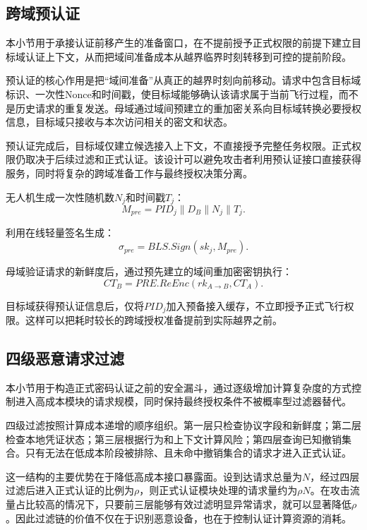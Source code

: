 \documentclass[conference]{IEEEtran}
\begin{document}
	\subsection{跨域预认证}
	
	本小节用于承接认证前移产生的准备窗口，在不提前授予正式权限的前提下建立目标域认证上下文，从而把域间准备成本从越界临界时刻转移到可控的提前阶段。
	
	预认证的核心作用是把“域间准备”从真正的越界时刻向前移动。请求中包含目标域标识、一次性Nonce和时间戳，使目标域能够确认该请求属于当前飞行过程，而不是历史请求的重复发送。母域通过域间预建立的重加密关系向目标域转换必要授权信息，目标域只接收与本次访问相关的密文和状态。
	
	预认证完成后，目标域仅建立候选接入上下文，不直接授予完整任务权限。正式权限仍取决于后续过滤和正式认证。该设计可以避免攻击者利用预认证接口直接获得服务，同时将复杂的跨域准备工作与最终授权决策分离。
	
	无人机生成一次性随机数$N_j$和时间戳$T_j$：
	\begin{equation}
		M_{pre}=PID_j\parallel D_B\parallel N_j\parallel T_j.
	\end{equation}
	
	利用在线轻量签名生成：
	\begin{equation}
		\sigma_{pre}=BLS.Sign(sk_j,M_{pre}).
	\end{equation}
	
	母域验证请求的新鲜度后，通过预先建立的域间重加密密钥执行：
	\begin{equation}
		CT_B=PRE.ReEnc(rk_{A\rightarrow B},CT_A).
	\end{equation}
	
	目标域获得预认证信息后，仅将$PID_j$加入预备接入缓存，不立即授予正式飞行权限。这样可以把耗时较长的跨域授权准备提前到实际越界之前。
	
	\subsection{四级恶意请求过滤}
	
	本小节用于构造正式密码认证之前的安全漏斗，通过逐级增加计算复杂度的方式控制进入高成本模块的请求规模，同时保持最终授权条件不被概率型过滤器替代。
	
	四级过滤按照计算成本递增的顺序组织。第一层只检查协议字段和新鲜度；第二层检查本地凭证状态；第三层根据行为和上下文计算风险；第四层查询已知撤销集合。只有无法在低成本阶段被排除、且未命中撤销集合的请求才进入正式认证。
	
	这一结构的主要优势在于降低高成本接口暴露面。设到达请求总量为$N$，经过四层过滤后进入正式认证的比例为$\rho$，则正式认证模块处理的请求量约为$\rho N$。在攻击流量占比较高的情况下，只要前三层能够有效过滤明显异常请求，就可以显著降低$\rho$。因此过滤链的价值不仅在于识别恶意设备，也在于控制认证计算资源的消耗。
	
\end{document}
